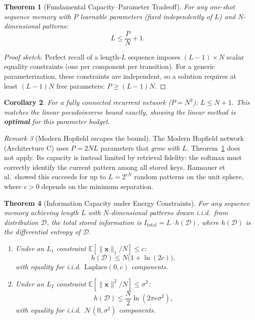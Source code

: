 \documentclass[11pt]{article}
\newtheorem{theorem}{Theorem}
\newtheorem{corollary}[theorem]{Corollary}
\theoremstyle{definition}
\theoremstyle{remark}
\newtheorem{remark}[theorem]{Remark}
\begin{document}
\begin{theorem}[Fundamental Capacity--Parameter Tradeoff]\label{thm:tradeoff}
For any one-shot sequence memory with $P$ learnable parameters (fixed independently of $L$) and $N$-dimensional patterns:
\[
    L \leq \frac{P}{N} + 1.
\]
\end{theorem}

\begin{proof}[Proof sketch]
Perfect recall of a length-$L$ sequence imposes $(L-1) \times N$ scalar equality constraints (one per component per transition). For a generic parameterization, these constraints are independent, so a solution requires at least $(L-1)N$ free parameters: $P \geq (L-1)N$.
\end{proof}

\begin{corollary}
For a fully connected recurrent network ($P = N^2$): $L \leq N + 1$. This matches the linear pseudoinverse bound exactly, showing the linear method is \textbf{optimal} for this parameter budget.
\end{corollary}

\begin{remark}[Modern Hopfield escapes the bound]
The Modern Hopfield network (Architecture C) uses $P = 2NL$ parameters that \emph{grow with $L$}. Theorem~\ref{thm:tradeoff} does not apply. Its capacity is instead limited by retrieval fidelity: the softmax must correctly identify the current pattern among all stored keys. Ramsauer et al.\ showed this succeeds for up to $L = 2^{cN}$ random patterns on the unit sphere, where $c > 0$ depends on the minimum separation.
\end{remark}

\begin{theorem}[Information Capacity under Energy Constraints]\label{thm:info}
For any sequence memory achieving length $L$ with $N$-dimensional patterns drawn i.i.d.\ from distribution $\mathcal{D}$, the total stored information is $I_{\mathrm{total}} = L \cdot h(\mathcal{D})$, where $h(\mathcal{D})$ is the differential entropy of $\mathcal{D}$.
\begin{enumerate}
    \item[(i)] Under an $L_1$ constraint $\mathbb{E}[\|\mathbf{x}\|_1 / N] \leq c$:
    \[
        h(\mathcal{D}) \leq N\bigl(1 + \ln(2c)\bigr),
    \]
    with equality for i.i.d.\ $\mathrm{Laplace}(0, c)$ components.
    \item[(ii)] Under an $L_2$ constraint $\mathbb{E}[\|\mathbf{x}\|^2 / N] \leq \sigma^2$:
    \[
        h(\mathcal{D}) \leq \frac{N}{2}\ln(2\pi e \sigma^2),
    \]
    with equality for i.i.d.\ $\mathcal{N}(0, \sigma^2)$ components.
\end{enumerate}
\end{theorem}
\end{document}
